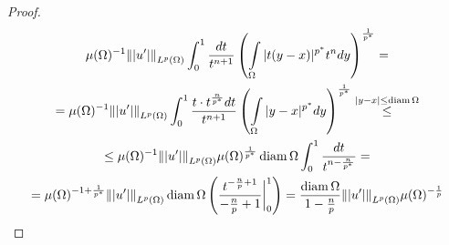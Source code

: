 \documentclass[12pt,a4paper]{article}
\newcommand{\intset}[1]{\int\limits_{#1}}
\DeclareMathOperator\diam{diam}
\begin{document}
\begin{proof}
\begin{multline*}
		\mu(\Omega)^{-1} \norm{|u^\prime|}_{L^p (\Omega)} \int_{0}^{1}{\frac{dt}{t^{n+1}} \left(\intset{\Omega}{|t(y - x)|^{p^*} t^n dy}\right)^{\frac{1}{p^*}}} = \\ =
		\mu(\Omega)^{-1} \norm{|u^\prime|}_{L^p (\Omega)} \int_{0}^{1}{\frac{t\cdot t^{\frac{n}{p^*}}dt}{t^{n+1}} \left(\intset{\Omega}{|y - x|^{p^*} dy}\right)^{\frac{1}{p^*}}} \overset{|y-x| \leq \diam \Omega}{\leq} \\ \leq 
		\mu(\Omega)^{-1} \norm{|u^\prime|}_{L^p (\Omega)} \mu(\Omega)^{\frac{1}{p^*}} \diam \Omega \int_{0}^{1}{\frac{dt}{t^{n-\frac{n}{p^*}}}} = \\ =
		\mu(\Omega)^{-1 + \frac{1}{p^*}} \norm{|u^\prime|}_{L^p (\Omega)} \diam \Omega \left(\frac{t^{-\frac{n}{p} + 1}}{-\frac{n}{p} + 1} \bigg\rvert_0^1\right) = \frac{\diam \Omega}{1 - \frac{n}{p}} \norm{|u^\prime|}_{L^p (\Omega)} \mu(\Omega)^{-\frac{1}{p}}
	\end{multline*}
\end{proof}
\end{document}
